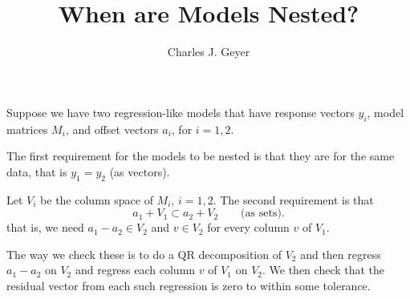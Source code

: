 \documentclass{article}
\begin{document}
\title{When are Models Nested?}

\author{Charles J. Geyer}

\maketitle

Suppose we have two regression-like models that have response vectors $y_i$,
model matrices $M_i$, and offset vectors $a_i$, for $i = 1, 2$.

The first requirement for the models to be nested is that they are for
the same data, that is $y_1 = y_2$ (as vectors).

Let $V_i$ be the column space of $M_i$, $i = 1, 2$.
The second requirement is that
$$
   a_1 + V_1 \subset a_2 + V_2 \qquad \text{(as sets)}.
$$
that is, we need $a_1 - a_2 \in V_2$ and $v \in V_2$ for every column $v$
of $V_1$.

The way we check these is to do a QR decomposition of $V_2$ and then
regress $a_1 - a_2$ on $V_2$ and regress each column $v$ of $V_1$ on $V_2$.
We then check that the residual vector from each such regression is
zero to within some tolerance.
\end{document}
